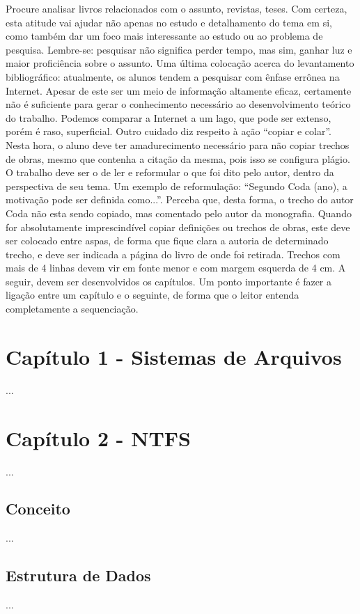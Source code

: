 Procure analisar livros relacionados com o assunto, revistas, teses. Com certeza, esta atitude vai ajudar não apenas no estudo e detalhamento do tema em si, como também dar um foco mais interessante ao estudo ou ao problema de pesquisa. Lembre-se: pesquisar não significa perder tempo, mas sim, ganhar luz e maior proficiência sobre o assunto.
Uma última colocação acerca do levantamento bibliográfico: atualmente, os alunos tendem a pesquisar com ênfase errônea na Internet. Apesar de este ser um meio de informação altamente eficaz, certamente não é suficiente para gerar o conhecimento necessário ao desenvolvimento teórico do trabalho. Podemos comparar a Internet a um lago, que pode ser extenso, porém é raso, superficial.
Outro cuidado diz respeito à ação “copiar e colar”.  Nesta hora, o aluno deve ter amadurecimento necessário para não copiar trechos de obras, mesmo que contenha a citação da mesma, pois isso  se configura plágio. O trabalho deve ser o de ler e reformular o que foi dito pelo autor, dentro da perspectiva de seu tema. Um exemplo de reformulação: “Segundo Coda (ano), a motivação pode ser definida como...”. Perceba que, desta forma, o trecho do autor Coda não esta sendo copiado, mas comentado pelo autor da monografia.
Quando for absolutamente imprescindível copiar definições ou trechos de obras, este deve ser colocado entre aspas, de forma que fique clara a autoria de determinado trecho, e deve ser indicada a página do livro de onde foi retirada. Trechos com mais de 4 linhas devem vir em fonte menor e com margem esquerda de 4 cm.
A seguir, devem ser desenvolvidos os capítulos. Um ponto importante é fazer a ligação entre um capítulo e o seguinte, de forma que o leitor entenda completamente a sequenciação.

\chapter{Capítulo 1 - Sistemas de Arquivos}
...

\chapter{Capítulo 2 - NTFS}
...

\section{Conceito}
...

\section{Estrutura de Dados}
...

